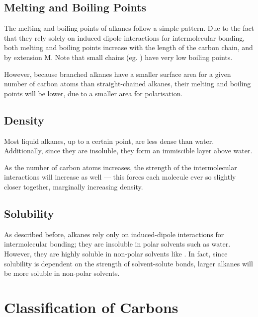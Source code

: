 		\subsection{Melting and Boiling Points}

			The melting and boiling points of alkanes follow a simple pattern. Due to the fact that they rely solely on induced
			dipole interactions for intermolecular bonding, both melting and boiling points increase with the length of the
			carbon chain, and by extension M. Note that small chains (eg. ) have very low boiling points.

			However, because branched alkanes have a smaller surface area for a given number of carbon atoms than straight-chained
			alkanes, their melting and boiling points will be lower, due to a smaller area for polarisation.


		\subsection{Density}

			Most liquid alkanes, up to a certain point, are less dense than water. Additionally, since they are insoluble,
			they form an immiscible layer above water.

			As the number of carbon atoms increases, the strength of the intermolecular interactions will increase as well --- this
			forces each molecule ever so slightly closer together, marginally increasing density.


		\subsection{Solubility}

			As described before, alkanes rely only on induced-dipole interactions for intermolecular bonding; they are insoluble in
			polar solvents such as water. However, they are highly soluble in non-polar solvents like . In fact,
			since solubility is dependent on the strength of solvent-solute bonds, larger alkanes will be more soluble in non-polar solvents.




	\pagebreak
	\section{Classification of Carbons}

